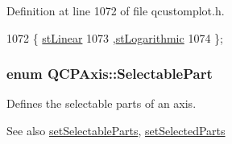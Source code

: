 Definition at line 1072 of file qcustomplot.\+h.


\begin{DoxyCode}
1072                  \{ \hyperlink{class_q_c_p_axis_a36d8e8658dbaa179bf2aeb973db2d6f0aff6e30a11a828bc850caffab0ff994f6}{stLinear}       
1073                    ,\hyperlink{class_q_c_p_axis_a36d8e8658dbaa179bf2aeb973db2d6f0abf5b785ad976618816dc6f79b73216d4}{stLogarithmic} 
1074                  \};
\end{DoxyCode}
\hypertarget{class_q_c_p_axis_abee4c7a54c468b1385dfce2c898b115f}{}
\subsubsection[{Selectable\+Part}]{\setlength{\rightskip}{0pt plus 5cm}enum {\bf Q\+C\+P\+Axis\+::\+Selectable\+Part}}\label{class_q_c_p_axis_abee4c7a54c468b1385dfce2c898b115f}
Defines the selectable parts of an axis. \begin{DoxySeeAlso}{See also}
\hyperlink{class_q_c_p_axis_a513f9b9e326c505d9bec54880031b085}{set\+Selectable\+Parts}, \hyperlink{class_q_c_p_axis_ab9d7a69277dcbed9119b3c1f25ca19c3}{set\+Selected\+Parts} 
\end{DoxySeeAlso}
